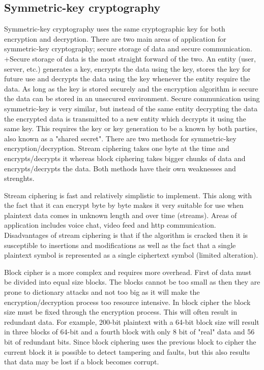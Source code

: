 \subsection{Symmetric-key cryptography}
Symmetric-key cryptography uses the same cryptographic key for both encryption and decryption. There are two main areas of application for symmetric-key cryptography; secure storage of data and secure communication. +Secure storage of data is the most straight forward of the two. An entity (user, server, etc.) generates a key, encrypts the data using the key, stores the key for future use and decrypts the data using the key whenever the entity require the data. As long as the key is stored securely and the encryption algorithm is secure the data can be stored in an unsecured environment. Secure communication using symmetric-key is very similar, but instead of the same entity decrypting the data the encrypted data is transmitted to a new entity which decrypts it using the same key. This requires the key or key generation to be a known by both parties, also known as a "shared secret". There are two methods for symmetric-key encryption/decryption. Stream ciphering takes one byte at the time and encrypts/decrypts it whereas block ciphering takes bigger chunks of data and encrypts/decrypts the data. Both methods have their own weaknesses and strenghts.

Stream ciphering is fast and relatively simplistic to implement. This along with the fact that it can encrypt byte by byte makes it very suitable for use when plaintext data comes in  unknown length and over time (streams). Areas of application includes voice chat, video feed and http communication. Disadvantages of stream ciphering is that if the algorithm is cracked then it is susceptible to insertions and modifications as well as the fact that a single plaintext symbol is represented as a single ciphertext symbol (limited alteration).

Block cipher is a more complex and requires more overhead. First of data must be divided into equal size blocks. The blocks cannot be too small as then they are prone to dictionary attacks and not too big as it will make the encryption/decryption process too resource intensive. In block cipher the block size must be fixed through the encryption process. This will often result in redundant data. For example, 200-bit plaintext with a 64-bit block size will result in three blocks of 64-bit and a fourth block with only 8 bit of "real" data and 56 bit of redundant bits. Since block ciphering uses the previous block to cipher the current block it is possible to detect tampering and faults, but this also results that data may be lost if a block becomes corrupt.


